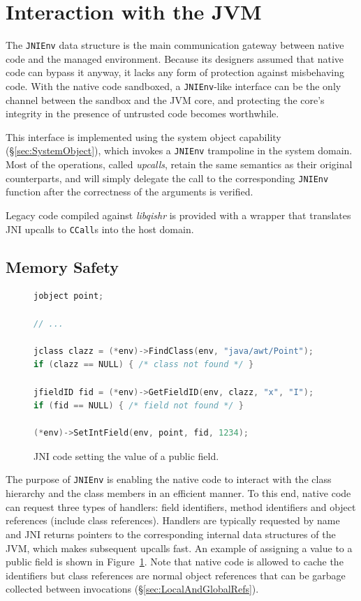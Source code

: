 \documentclass[a4paper,12pt,twoside,openright]{report}
\newcommand{\insn}[1]{\texttt{#1}}
\newcommand{\keyword}[1]{\textsf{#1}}
\newcommand{\tool}[1]{\emph{#1}}
\newcommand{\lib}[1]{\tool{lib#1}}
\begin{document}
\section{Interaction with the JVM}

The \texttt{JNIEnv} data structure is the main communication gateway between native code and the managed environment. Because its designers assumed that native code can bypass it anyway, it lacks any form of protection against misbehaving code. With the native code sandboxed, a \texttt{JNIEnv}-like interface can be the only channel between the sandbox and the JVM core, and protecting the core's integrity in the presence of untrusted code becomes worthwhile.

This interface is implemented using the system object capability (\S\ref{sec:SystemObject}), which invokes a \texttt{JNIEnv} trampoline in the system domain. Most of the operations, called \emph{upcalls}, retain the same semantics as their original counterparts, and will simply delegate the call to the corresponding \texttt{JNIEnv} function after the correctness of the arguments is verified. 

Legacy code compiled against \lib{qishr} is provided with a wrapper that translates JNI upcalls to \insn{CCall}s into the host domain.

\subsection{Memory Safety}
\label{sec:MemorySafety}

\begin{figure}[t]
	\begin{lstlisting}[language=C]
jobject point;

// ...

jclass clazz = (*env)->FindClass(env, "java/awt/Point");
if (clazz == NULL) { /* class not found */ }

jfieldID fid = (*env)->GetFieldID(env, clazz, "x", "I");
if (fid == NULL) { /* field not found */ }

(*env)->SetIntField(env, point, fid, 1234);
	\end{lstlisting}
	\caption{JNI code setting the value of a public field.}
	\label{listing:SetFieldValue}
\end{figure}

The purpose of \texttt{JNIEnv} is enabling the native code to interact with the class hierarchy and the class members in an efficient manner. To this end, native code can request three types of handlers: field identifiers, method identifiers and object references (include class references). Handlers are typically requested by name and JNI returns pointers to the corresponding internal data structures of the JVM, which makes subsequent upcalls fast. An example of assigning a value to a \keyword{public} field is shown in Figure~\ref{listing:SetFieldValue}. Note that native code is allowed to cache the identifiers but class references are normal object references that can be garbage collected between invocations (\S\ref{sec:LocalAndGlobalRefs}). 
\end{document}
